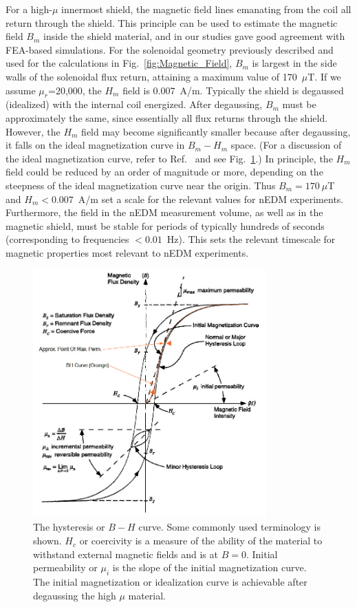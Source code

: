 For a high-$\mu$ innermost shield, the magnetic field lines emanating
from the coil all return through the shield.  This principle can be
used to estimate the magnetic field $B_m$ inside the shield material,
and in our studies gave good agreement with FEA-based simulations.
For the solenoidal geometry previously described and used for the
calculations in Fig.~\ref{fig:Magnetic_Field}, $B_m$ is largest in the
side walls of the solenoidal flux return, attaining a maximum value of
170~$\mu$T.  If we assume $\mu_r$=20,000, the $H_m$ field is
0.007~A/m.  Typically the shield is degaussed (idealized) with the
internal coil energized. After degaussing, $B_m$ must be approximately
the same, since essentially all flux returns through the shield.
However, the $H_m$ field may become significantly smaller because
after degaussing, it falls on the ideal magnetization curve in
$B_m-H_m$ space.  (For a discussion of the ideal magnetization curve,
refer to Ref.~\cite{bozorth1993ferromagnetism} and see
Fig.~\ref{fig:bh}.)  In principle, the $H_m$ field could be reduced by
an order of magnitude or more, depending on the steepness of the ideal
magnetization curve near the origin.  Thus $B_m=170~\mu$T and
$H_m<0.007$~A/m set a scale for the relevant values for nEDM
experiments.  Furthermore, the field in the nEDM measurement volume,
as well as in the magnetic shield, must be stable for periods of
typically hundreds of seconds (corresponding to frequencies
$<0.01$~Hz). This sets the relevant timescale for magnetic properties
most relevant to nEDM experiments.


\begin{figure}[h!]
  \centering
  \includegraphics[width=0.8\textwidth]{bh.jpg}
  \caption[The hysteresis or $B-H$ curve]{The hysteresis or $B-H$
    curve. Some commonly used terminology is shown. $H_c$ or
    coercivity is a measure of the ability of the material to
    withstand external magnetic fields and is at $B=0$. Initial
    permeability or $\mu_i$ is the slope of the initial magnetization
    curve. The initial magnetization or idealization curve is
    achievable after degaussing the high $\mu$ material.}
  \label{fig:bh}
\end{figure}
